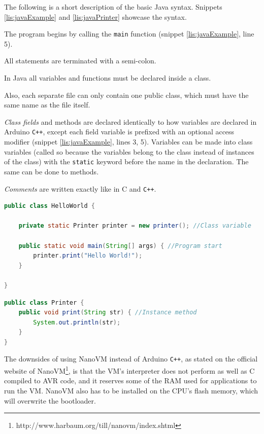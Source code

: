 The following is a short description of the basic Java syntax. 
Snippets \ref{lis:javaExample} and \ref{lis:javaPrinter} showcase the syntax.

The program begins by calling the \texttt{main} function (snippet \ref{lis:javaExample}, line 5).

All statements are terminated with a semi-colon.

In Java all variables and functions must be declared inside a class.

Also, each separate file can only contain one public class, which must have the same name as the file itself. 

\textit{Class fields} and methods are declared identically to how variables are declared in Arduino \texttt{C++}, except each field variable is prefixed with an optional access modifier (snippet \ref{lis:javaExample}, lines 3, 5).
Variables can be made into class variables (called so because the variables belong to the class instead of instances of the class) with the \texttt{static} keyword before the name in the declaration.
The same can be done to methods.

\textit{Comments} are written exactly like in C and \texttt{C++}.

\begin{lstlisting}[language=Java,label=lis:javaExample,caption=An example program written in Java.,firstnumber=1]
public class HelloWorld {

	private static Printer printer = new printer(); //Class variable
	
	public static void main(String[] args) { //Program start
		printer.print("Hello World!");
	}
	
}
\end{lstlisting}

\begin{lstlisting}[language=Java,label=lis:javaPrinter,caption=Printer class with one method written in Java.,firstnumber=1]
public class Printer {
	public void print(String str) { //Instance method
		System.out.println(str);
	}
}
\end{lstlisting}

The downsides of using NanoVM instead of Arduino \texttt{C++}, as stated on the official website of NanoVM\footnote{http://www.harbaum.org/till/nanovm/index.shtml}, is that the VM's interpreter does not perform as well as C compiled to AVR code, and it reserves some of the RAM used for applications to run the VM.
NanoVM also has to be installed on the CPU's flash memory, which will overwrite the bootloader.

